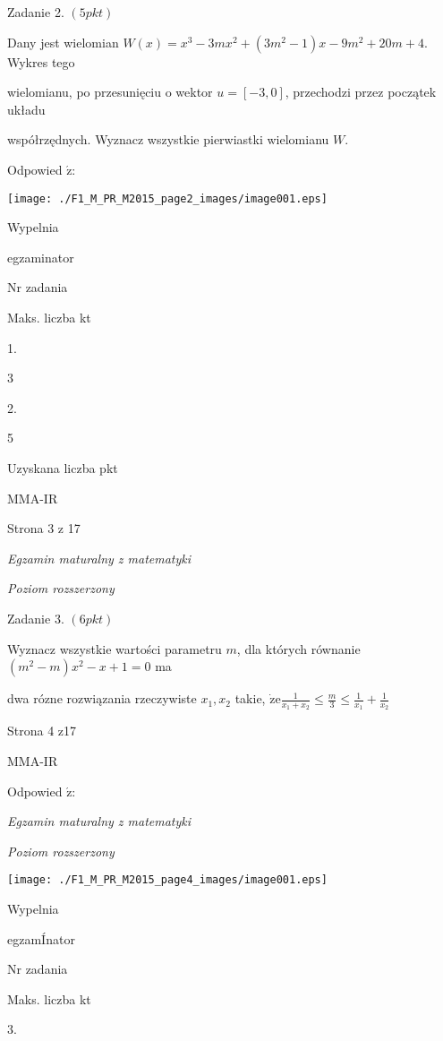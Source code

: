 \documentclass[a4paper,12pt]{article}
\begin{document}
Zadanie 2. $(5pkt)$

Dany jest wielomian $W(x)=x^{3}-3mx^{2}+(3m^{2}-1)x-9m^{2}+20m+4$. Wykres tego

wielomianu, po przesunięciu o wektor $u=[-3,0]$, przechodzi przez początek układu

współrzędnych. Wyznacz wszystkie pierwiastki wielomianu $W.$

Odpowied $\acute{\mathrm{z}}$:
\begin{center}
\texttt{[image: ./F1\_M\_PR\_M2015\_page2\_images/image001.eps]}
\end{center}
Wypelnia

egzaminator

Nr zadania

Maks. liczba kt

1.

3

2.

5

Uzyskana liczba pkt

MMA-IR

Strona 3 z 17





{\it Egzamin maturalny z matematyki}

{\it Poziom rozszerzony}

Zadanie 3. $(6pkt)$

Wyznacz wszystkie wartości parametru $m$, dla których równanie $(m^{2}-m)x^{2}-x+1=0$ ma

dwa rózne rozwiązania rzeczywiste $x_{1}, x_{2}$ takie, $\displaystyle \dot{\mathrm{z}}\mathrm{e}\frac{1}{x_{1}+x_{2}}\leq\frac{m}{3}\leq\frac{1}{x_{1}}+\frac{1}{x_{2}}$

Strona 4 z17

MMA-IR





Odpowied $\acute{\mathrm{z}}$:

{\it Egzamin maturalny z matematyki}

{\it Poziom rozszerzony}
\begin{center}
\texttt{[image: ./F1\_M\_PR\_M2015\_page4\_images/image001.eps]}
\end{center}
Wypelnia

egzamÍnator

Nr zadania

Maks. liczba kt

3.
\end{document}
